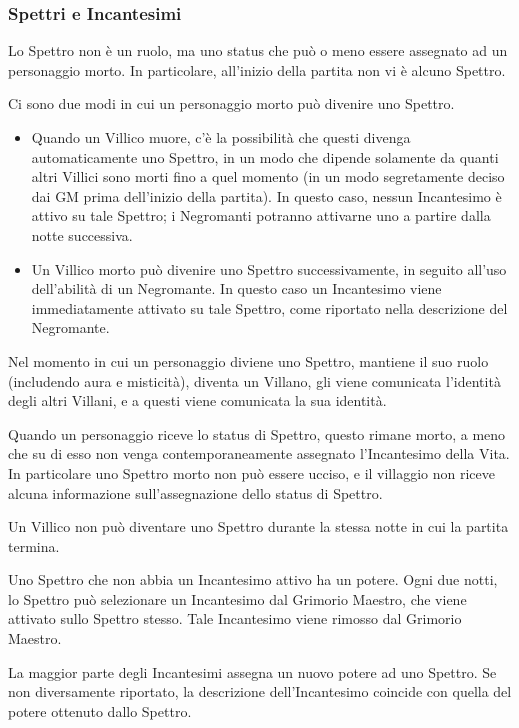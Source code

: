 \documentclass[a4paper,10pt]{article}
\begin{document}
\subsubsection*{Spettri e Incantesimi}
\label{spettri}
\label{incantesimi}

Lo Spettro non è un ruolo, ma uno status che può o meno essere assegnato ad un personaggio morto. In particolare, all'inizio della partita non vi è alcuno Spettro.

Ci sono due modi in cui un personaggio morto può divenire uno Spettro.

\begin{itemize}
      \item Quando un Villico muore, c'è la possibilità che questi divenga automaticamente uno Spettro, in un modo che dipende solamente da quanti altri Villici sono morti fino a quel momento (in un modo segretamente deciso dai GM prima dell'inizio della partita). In questo caso, nessun Incantesimo è attivo su tale Spettro; i Negromanti potranno attivarne uno a partire dalla notte successiva.

      \item Un Villico morto può divenire uno Spettro successivamente, in seguito all'uso dell'abilità di un Negromante. In questo caso un Incantesimo viene immediatamente attivato su tale Spettro, come riportato nella descrizione del Negromante.
\end{itemize}

Nel momento in cui un personaggio diviene uno Spettro, mantiene il suo ruolo (includendo aura e misticità), diventa un Villano, gli viene comunicata l'identità degli altri Villani, e a questi viene comunicata la sua identità.

Quando un personaggio riceve lo status di Spettro, questo rimane morto, a meno che su di esso non venga contemporaneamente assegnato l'Incantesimo della Vita. In particolare uno Spettro morto non può essere ucciso, e il villaggio non riceve alcuna informazione sull'assegnazione dello status di Spettro.

Un Villico non può diventare uno Spettro durante la stessa notte in cui la partita termina.

Uno Spettro che non abbia un Incantesimo attivo ha un potere. Ogni due notti, lo Spettro può selezionare un Incantesimo dal Grimorio Maestro, che viene attivato sullo Spettro stesso. Tale Incantesimo viene rimosso dal Grimorio Maestro.

La maggior parte degli Incantesimi assegna un nuovo potere ad uno Spettro. Se non diversamente riportato, la descrizione dell'Incantesimo coincide con quella del potere ottenuto dallo Spettro.
\end{document}
